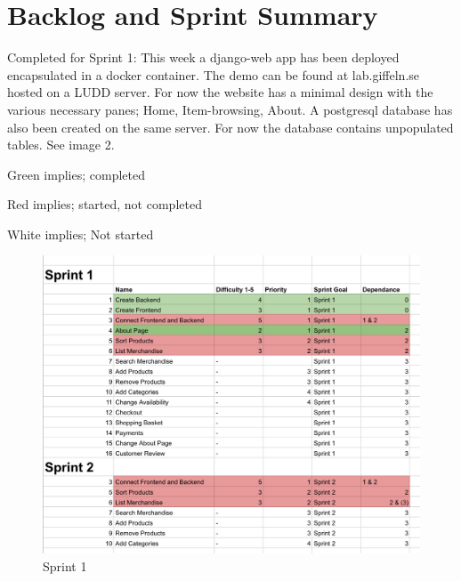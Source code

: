 \newpage

\section{Backlog and Sprint Summary}

Completed for Sprint 1: This week a django-web app has been deployed
encapsulated in a docker container. The demo can be found at lab.giffeln.se
hosted on a LUDD server. For now the website has a minimal design with the
various necessary panes; Home, Item-browsing, About. A postgresql database
has also been created on the same server. For now the database contains
unpopulated tables. See image 2.

Green implies; completed

Red implies; started, not completed 

White implies; Not started

\begin{figure}[H]
  \centering
  \includegraphics[width=\textwidth]{sprint1.png}
  \caption{\label{fig:sprint1} Sprint 1}
\end{figure}
